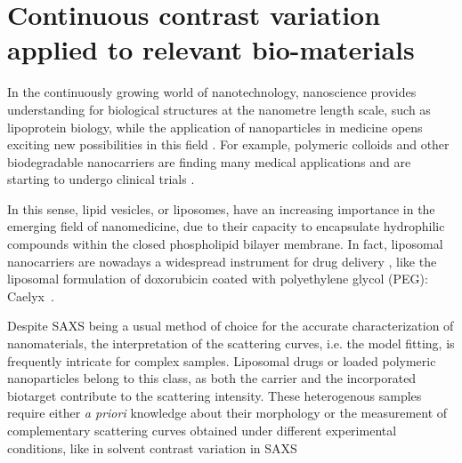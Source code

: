 \chapter{Continuous contrast variation applied to relevant bio-materials}
\label{chap:bio_applications}

In the continuously growing world of nanotechnology, nanoscience provides understanding for biological structures at the nanometre length scale, such as lipoprotein biology, while the application of nanoparticles in medicine opens exciting new possibilities in this field \citep{nie_nanotechnology_2007, sahoo_nanotech_2003, wickline_nanotechnology_2003, zhou_nano-enabled_2014, rosen_rise_2005}. For example, polymeric colloids and other biodegradable nanocarriers are finding many medical applications \citep{vicent_polymer_2006} and are starting to undergo clinical trials \citep{patel_polymeric_2012,beija_colloidal_2012,cabral_progress_2014}. 

In this sense, lipid vesicles, or liposomes, have an increasing importance in the emerging field of nanomedicine, due to their capacity to encapsulate hydrophilic compounds within the closed phospholipid bilayer membrane. In fact, liposomal nanocarriers are nowadays a widespread instrument for drug delivery \citep{perez-herrero_advanced_2015}, like the liposomal formulation of doxorubicin coated with polyethylene glycol (PEG): Caelyx\textregistered\ \citep{barenholz_doxil-first_2012}.



Despite SAXS being a usual method of choice for the accurate characterization of nanomaterials, the interpretation of the scattering curves, i.e. the model fitting, is frequently intricate for complex samples. Liposomal drugs or loaded polymeric nanoparticles belong to this class, as both the carrier and the incorporated biotarget contribute to the scattering intensity. These heterogenous samples require either \emph{a priori} knowledge about their morphology or the measurement of complementary scattering curves obtained under different experimental conditions, like in solvent contrast variation in SAXS 


